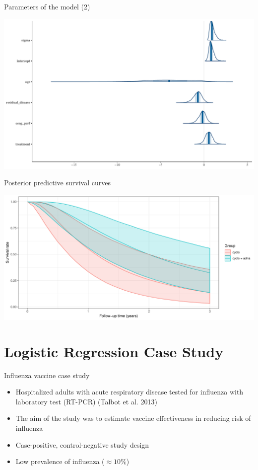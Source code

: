 \documentclass[ignorenonframetext,a4paper]{beamer}
\begin{document}
\begin{frame}{Parameters of the model (2)}

\includegraphics{DB_presentation_case_study_files/figure-beamer/unnamed-chunk-23-1.pdf}

\end{frame}

\begin{frame}{Posterior predictive survival curves}

\includegraphics{DB_presentation_case_study_files/figure-beamer/unnamed-chunk-24-1.pdf}

\end{frame}

\section{Logistic Regression Case
Study}\label{logistic-regression-case-study}

\begin{frame}{Influenza vaccine case study}

\begin{itemize}
\item
  Hospitalized adults with acute respiratory disease tested for
  influenza with laboratory test (RT-PCR) (Talbot et al. 2013)
\item
  The aim of the study was to estimate vaccine effectiveness in reducing
  risk of influenza
\item
  Case-positive, control-negative study design
\item
  Low prevalence of influenza (\(\approx 10 \%\))
\end{itemize}

\end{frame}
\end{document}
